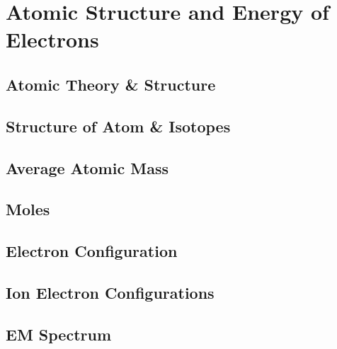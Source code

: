 \documentclass[../hchem.tex]{subfiles}
\begin{document}
\chapter{Atomic Structure and Energy of Electrons}
\section{Atomic Theory \& Structure}
\section{Structure of Atom \& Isotopes}
\section{Average Atomic Mass}
\section{Moles}
\section{Electron Configuration}
\section{Ion Electron Configurations}
\section{EM Spectrum}
\end{document}
